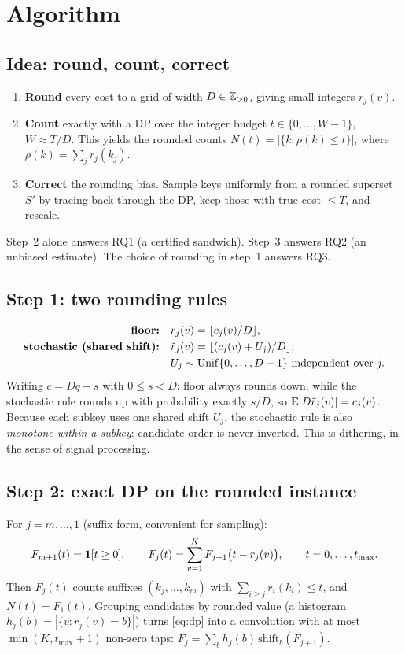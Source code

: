 \section{Algorithm}\label{sec:algo}

\subsection{Idea: round, count, correct}
\begin{enumerate}[nosep]
\item \textbf{Round} every cost to a grid of width $D\in\mathbb{Z}_{>0}$, giving small integers $r_j(v)$.
\item \textbf{Count} exactly with a DP over the integer budget $t\in\{0,\dots,W-1\}$, $W\approx T/D$.
      This yields the rounded counts $N(t)=|\{k:\rho(k)\le t\}|$, where $\rho(k)=\sum_j r_j(k_j)$.
\item \textbf{Correct} the rounding bias. Sample keys uniformly from a rounded superset $S'$ by
      tracing back through the DP, keep those with true cost $\le T$, and rescale.
\end{enumerate}
Step~2 alone answers RQ1 (a certified sandwich). Step~3 answers RQ2 (an unbiased estimate).
The choice of rounding in step~1 answers RQ3.

\subsection{Step 1: two rounding rules}
\begin{align*}
\textbf{floor:}\quad & r_j(v)=\lfloor c_j(v)/D\rfloor,\\
\textbf{stochastic (shared shift):}\quad & \tilde r_j(v)=\lfloor(c_j(v)+U_j)/D\rfloor,\\
& U_j\sim\mathrm{Unif}\{0,\dots,D-1\}\ \text{independent over } j.
\end{align*}
Writing $c=Dq+s$ with $0\le s<D$: floor always rounds down, while the stochastic rule rounds up
with probability exactly $s/D$, so $\mathbb{E}[D\tilde r_j(v)]=c_j(v)$. Because each subkey uses one shared
shift $U_j$, the stochastic rule is also \emph{monotone within a subkey}: candidate order is
never inverted. This is dithering, in the sense of signal processing.

\subsection{Step 2: exact DP on the rounded instance}
For $j=m,\dots,1$ (suffix form, convenient for sampling):
\begin{equation}\label{eq:dp}
F_{m+1}(t)=\mathbf{1}[t\ge0],\qquad F_j(t)=\sum_{v=1}^{K}F_{j+1}\big(t-r_j(v)\big),\qquad t=0,\dots,t_{\max}.
\end{equation}
Then $F_j(t)$ counts suffixes $(k_j,\dots,k_m)$ with $\sum_{i\ge j}r_i(k_i)\le t$, and $N(t)=F_1(t)$.
Grouping candidates by rounded value (a histogram $h_j(b)=|\{v:r_j(v)=b\}|$) turns \eqref{eq:dp}
into a convolution with at most $\min(K,t_{\max}+1)$ non-zero taps:
$F_j=\sum_b h_j(b)\,\mathrm{shift}_b(F_{j+1})$.

